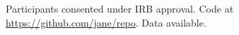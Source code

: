 \documentclass{article}
\author{Anonymous Authors}
\begin{document}
Participants consented under IRB approval. Code at \url{https://github.com/jane/repo}. Data available.
\end{document}
